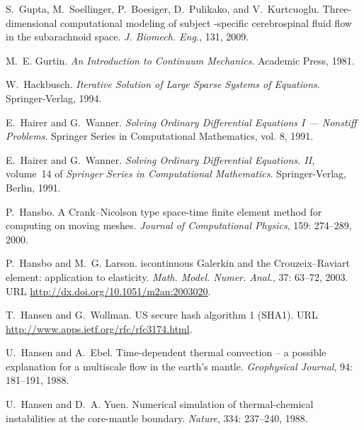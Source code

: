\begin{thebibliography}{467}
S.~Gupta, M.~Soellinger, P.~Boesiger, D.~Pulikako, and V.~Kurtcuoglu.
\newblock Three-dimensional computational modeling of subject -specific
  cerebrospinal fluid flow in the subarachnoid space.
\newblock \emph{J. Biomech. Eng.}, 131, 2009.

M.~E. Gurtin.
\newblock \emph{An Introduction to Continuum Mechanics}.
\newblock Academic Press, 1981.

W.~Hackbusch.
\newblock \emph{Iterative Solution of Large Sparse Systems of Equations}.
\newblock Springer-Verlag, 1994.

E.~Hairer and G.~Wanner.
\newblock \emph{Solving Ordinary Differential Equations {I} --- Nonstiff
  Problems}.
\newblock Springer Series in Computational Mathematics, vol. 8,
  1991{}.

E.~Hairer and G.~Wanner.
\newblock \emph{Solving Ordinary Differential Equations. {II}}, volume~14 of
  \emph{Springer Series in Computational Mathematics}.
\newblock Springer-Verlag, Berlin, 1991{}.

P.~Hansbo.
\newblock A {C}rank--{N}icolson type space-time finite element method for
  computing on moving meshes.
\newblock \emph{Journal of Computational Physics}, 159: 274--289,
  2000.

P.~Hansbo and M.~G. Larson.
iscontinuous {G}alerkin and the {C}rouzeix--{R}aviart element:
  application to elasticity.
\newblock \emph{Math. Model. Numer. Anal.}, 37: 63--72, 2003.
\newblock URL \url{http://dx.doi.org/10.1051/m2an:2003020}.

T.~Hansen and G.~Wollman.
\newblock US secure hash algorithm 1 (SHA1).
\newblock URL \url{http://www.apps.ietf.org/rfc/rfc3174.html}.

U.~Hansen and A.~Ebel.
\newblock Time-dependent thermal convection -- a possible explanation for a
  multiscale flow in the earth's mantle.
\newblock \emph{Geophysical Journal}, 94: 181--191, 1988.

U.~Hansen and D.~A. Yuen.
\newblock Numerical simulation of thermal-chemical instabilities at the
  core-mantle boundary.
\newblock \emph{Nature}, 334: 237--240, 1988.


\end{thebibliography}
